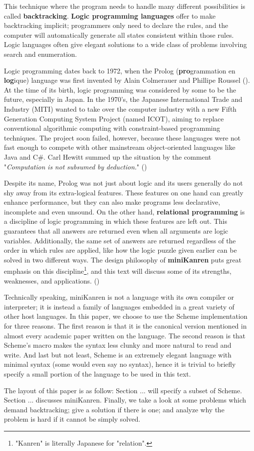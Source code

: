 This technique where the program needs to handle many different possibilities is called \textbf{backtracking}. \textbf{Logic programming languages} offer to make backtracking implicit; programmers only need to declare the rules, and the computer will automatically generate all states consistent within those rules. Logic languages often give elegant solutions to a wide class of problems involving search and enumeration.

Logic programming dates back to 1972, when the Prolog (\textbf{pro}grammation en \textbf{log}ique) language was first invented by Alain Colmerauer and Phillipe Roussel (\cite{early-prolog}). At the time of its birth, logic programming was considered by some to be the future, especially in Japan. In the 1970's, the Japanese International Trade and Industry (MITI) wanted to take over the computer industry with a new Fifth Generation Computing System Project (named ICOT), aiming to replace conventional algorithmic computing with constraint-based programming techniques. The project soon failed, however, because these languages were not fast enough to compete with other mainstream object-oriented languages like Java and C\#. Carl Hewitt summed up the situation by the comment "\textit{Computation is not subsumed by deduction.}" (\cite{logic-fail})

Despite its name, Prolog was not just about logic and its users generally do not shy away from its extra-logical features. These features on one hand can greatly enhance performance, but they can also make programs less declarative, incomplete and even unsound. On the other hand, \textbf{relational programming} is a discipline of logic programming in which these features are left out. This guarantees that all answers are returned even when all arguments are logic variables. Additionally, the same set of answers are returned regardless of the order in which rules are applied, like how the logic puzzle given earlier can be solved in two different ways. The design philosophy of \textbf{miniKanren} puts great emphasis on this discipline\footnote{"Kanren" is literally Japanese for "relation".}, and this text will discuss some of its strengths, weaknesses, and applications. (\cite{byrdphd})

Technically speaking, miniKanren is not a language with its own compiler or interpreter; it is instead a family of languages embedded in a great variety of other host languages. In this paper, we choose to use the Scheme implementation for three reasons. The first reason is that it is the canonical version mentioned in almost every academic paper written on the language. The second reason is that Scheme's macro makes the syntax less clunky and more natural to read and write. And last but not least, Scheme is an extremely elegant language with minimal syntax (some would even say no syntax), hence it is trivial to briefly specify a small portion of the language to be used in this text.

The layout of this paper is as follow: Section ... will specify a subset of Scheme. Section ... discusses miniKanren. Finally, we take a look at some problems which demand backtracking; give a solution if there is one; and analyze why the problem is hard if it cannot be simply solved.